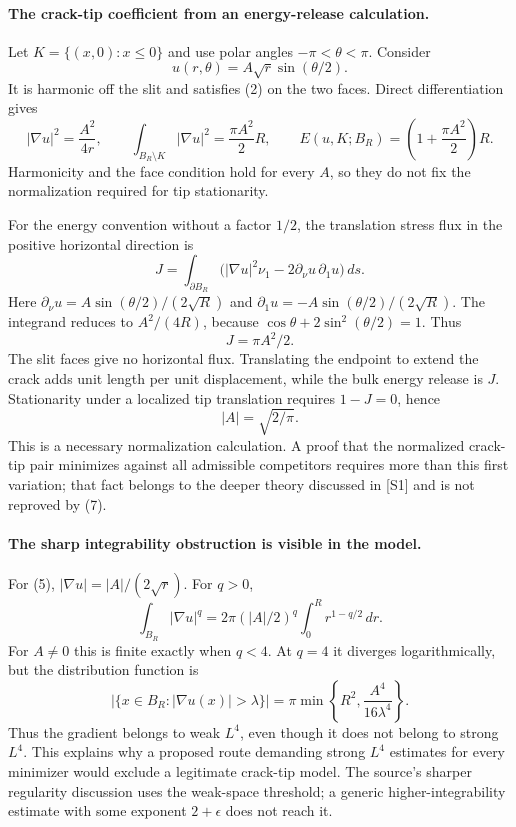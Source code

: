 \documentclass[11pt]{article}
\begin{document}
\paragraph{The crack-tip coefficient from an energy-release calculation.}
Let $K=\{(x,0):x\le0\}$ and use polar angles $-\pi<\theta<\pi$.
Consider
\[
                         u(r,\theta)=A\sqrt r\sin(\theta/2).
                                                               \tag{5}
\]
It is harmonic off the slit and satisfies (2) on the two faces.
Direct differentiation gives
\[
 |\nabla u|^2=\frac{A^2}{4r},\qquad
 \int_{B_R\setminus K}|\nabla u|^2=\frac{\pi A^2}{2}R,
 \qquad E(u,K;B_R)=\left(1+\frac{\pi A^2}{2}\right)R.    \tag{6}
\]
Harmonicity and the face condition hold for every $A$, so they do not
fix the normalization required for tip stationarity.

For the energy convention without a factor $1/2$, the translation
stress flux in the positive horizontal direction is
\[
 J=\int_{\partial B_R}
      \bigl(|\nabla u|^2\nu_1-2\partial_\nu u\,\partial_1u\bigr)\,ds.
\]
Here $\partial_\nu u=A\sin(\theta/2)/(2\sqrt R)$ and
$\partial_1u=-A\sin(\theta/2)/(2\sqrt R)$.
The integrand reduces to $A^2/(4R)$, because
$\cos\theta+2\sin^2(\theta/2)=1$. Thus
\[
                                  J=\pi A^2/2.          \tag{7}
\]
The slit faces give no horizontal flux. Translating the endpoint to
extend the crack adds unit length per unit displacement, while the
bulk energy release is $J$. Stationarity under a localized tip
translation requires $1-J=0$, hence
\[
                                  |A|=\sqrt{2/\pi}.     \tag{8}
\]
This is a necessary normalization calculation. A proof that the
normalized crack-tip pair minimizes against all admissible competitors
requires more than this first variation; that fact belongs to the
deeper theory discussed in [S1] and is not reproved by (7).

\paragraph{The sharp integrability obstruction is visible in the model.}
For (5), $|\nabla u|=|A|/(2\sqrt r)$. For $q>0$,
\[
 \int_{B_R}|\nabla u|^q
    =2\pi(|A|/2)^q\int_0^R r^{1-q/2}\,dr.
\]
For $A\ne0$ this is finite exactly when $q<4$.
At $q=4$ it diverges logarithmically, but the distribution function is
\[
 |\{x\in B_R:|\nabla u(x)|>\lambda\}|
     =\pi\min\left\{R^2,\frac{A^4}{16\lambda^4}\right\}. \tag{9}
\]
Thus the gradient belongs to weak $L^4$, even though it does not belong
to strong $L^4$. This explains why a proposed route demanding strong
$L^4$ estimates for every minimizer would exclude a legitimate crack-tip
model. The source's sharper regularity discussion uses the weak-space
threshold; a generic higher-integrability estimate with some exponent
$2+\epsilon$ does not reach it.
\end{document}
